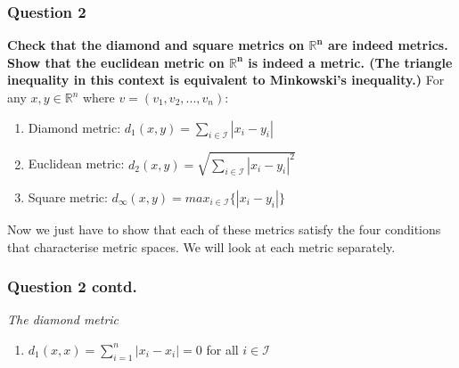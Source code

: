\begin{frame}
\frametitle{Question 2}
\textbf{Check that the diamond and square metrics on $\bm{\mathbb{R}^n}$ are indeed metrics. Show that the euclidean metric on $\bm{\mathbb{R}^n}$ is indeed a metric. (The triangle inequality in this context is equivalent to Minkowski’s inequality.)}\hfill\break
\hfill\break
For any $x, y \in \mathbb{R}^n $ where $v = (v_1, v_2,...,v_n)$: 
\begin{enumerate}
    \item Diamond metric: $d_1(x,y) = \sum_{i\in \mathcal{I}} |x_i - y_i| $
    \item Euclidean metric: $d_2(x,y) = \sqrt{\sum_{i\in \mathcal{I}} |x_i - y_i|^2} $
    \item Square metric: $d_{\infty}(x,y) = max_{i\in \mathcal{I}}\{|x_i - y_i|\}$
\end{enumerate}
\hfill\break
Now we just have to show that each of these metrics satisfy the four conditions that characterise metric spaces. We will look at each metric separately.
\end{frame}

\begin{frame}
\frametitle{Question 2 contd.}
\textit{The diamond metric}\hfill\break
\hfill\break
\begin{enumerate}
    \item $d_1(x,x) = \sum_{i=1}^{n} |x_i - x_i| = 0$ for all $i\in \mathcal{I}$
\end{enumerate}
\end{frame}